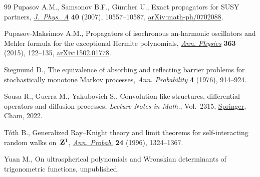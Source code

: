 \documentclass[pdftex]{sigma}
\numberwithin{equation}{section}
\theoremstyle{definition}
\begin{document}
\begin{thebibliography}{99}
Pupasov A.M., Samsonov B.F., G\"unther U., Exact propagators for {SUSY}
 partners,
 \href{https://doi.org/10.1088/1751-8113/40/34/013}{\textit{J.~Phys.~A}}
 \textbf{40} (2007), 10557--10587,
 \href{http://arxiv.org/abs/math-ph/0702088}{arXiv:math-ph/0702088}.

Pupasov-Maksimov A.M., Propagators of isochronous an-harmonic oscillators and
 {M}ehler formula for the exceptional {H}ermite polynomials,
 \href{https://doi.org/10.1016/j.aop.2015.09.021}{\textit{Ann. Physics}}
 \textbf{363} (2015), 122--135,
 \href{http://arxiv.org/abs/1502.01778}{arXiv:1502.01778}.

Siegmund D., The equivalence of absorbing and reflecting barrier problems for
 stochastically monotone {M}arkov processes,
 \href{https://doi.org/10.1214/aop/1176995936}{\textit{Ann. Probability}}
 \textbf{4} (1976), 914--924.

Sousa R., Guerra M., Yakubovich S., Convolution-like structures, differential
 operators and diffusion processes, \textit{Lecture Notes in Math.}, Vol.~2315, \href{https://doi.org/10.1007/978-3-031-05296-5}{Springer}, Cham, 2022.

T\'oth B., Generalized {R}ay--{K}night theory and limit theorems for
 self-interacting random walks on~{${\bf Z}^1$},
 \href{https://doi.org/10.1214/aop/1065725184}{\textit{Ann. Probab.}}
 \textbf{24} (1996), 1324--1367.

Yuan M., On ultraspherical polynomials and {W}ronskian determinants of
 trigonometric functions, {u}npublished.

\end{thebibliography}\LastPageEnding
\end{document}
